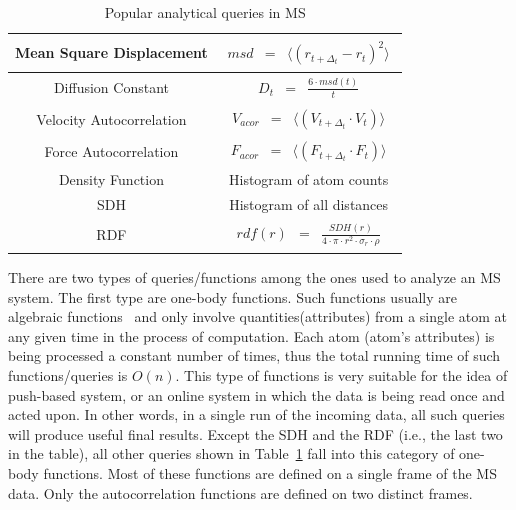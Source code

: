 \documentclass[10pt,journal,final,letterpaper,twocolumn]{IEEEtran}
\begin{document}
\begin{table}[h]
{\begin{minipage}{\columnwidth}
\begin{tabular}{|c| c|}
\hline
Mean Square Displacement& $\begin{array} {lcl} msd & = & \langle (r_{t+\Delta_t}-r_t)^2 \rangle \end{array}$ \\[0.5ex]
\hline
Diffusion Constant & $\begin{array} {lcl} D_t & = & \frac{6 \cdot msd(t)}{t} \end{array}$ \\[0.5ex]
\hline Velocity Autocorrelation & $\begin{array} {lcl} V_{acor} & =&
\langle (V_{t+\Delta_t}\cdot V_t) \rangle \end{array}$ \\[0.5ex]
\hline
Force Autocorrelation & $\begin{array} {lcl} F_{acor} & = & \langle (F_{t+\Delta_t} \cdot F_t) \rangle \end{array}$ \\[0.5ex]
\hline
Density Function & Histogram of atom counts \\[0.5ex]
\hline
SDH & Histogram of all distances \\[0.5ex]
\hline
RDF & $\begin{array} {lcl} rdf(r) & = & \frac{SDH(r)}{4 \cdot \pi \cdot r^2 \cdot \sigma_r \cdot \rho} \end{array}$ \\[0.5ex]
\hline
\end{tabular}
\caption[Table caption text]{Popular analytical queries in MS }
\label{tb:queries}
\end{minipage} }
\end{table}

There are two types of queries/functions among the ones used to
analyze an MS system. The first type are one-body functions. Such
functions usually are algebraic functions~\cite{SDSS_SIGMOD02} and
only involve quantities(attributes) from a single atom at any given
time in the process of computation. Each atom (atom's attributes) is
being processed a constant number of times, thus the total running
time of such functions/queries is $O(n)$. This type of functions is
very suitable for the idea of push-based system, or an online system
in which the data is being read once and acted upon. In other words,
in a single run of the incoming data, all such queries will produce
useful final results. Except the SDH and the RDF (i.e., the last two
in the table), all other queries shown in Table~\ref{tb:queries}
fall into this category of one-body functions. Most of these
functions are defined on a single frame of the MS data. Only the
autocorrelation functions are defined on two distinct frames.
\end{document}

